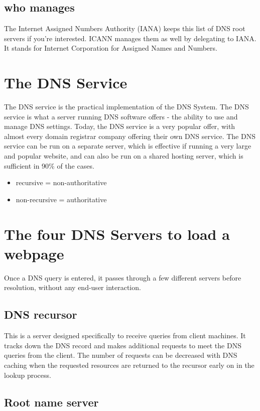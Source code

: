 \documentclass[a4paper,12pt]{book}
\begin{document}
\subsection{who manages}
The Internet Assigned Numbers Authority (IANA) keeps this list of DNS root servers if you're interested. ICANN manages them as well by delegating to IANA. It stands for Internet Corporation for Assigned Names and Numbers.

\section{The DNS Service}
The DNS service is the practical implementation of the DNS System. The DNS service is what a server running DNS software offers - the ability to use and manage DNS settings. Today, the DNS service is a very popular offer, with almost every domain registrar company offering their own DNS service. The DNS service can be run on a separate server, which is effective if running a very large and popular website, and can also be run on a shared hosting server, which is sufficient in 90\% of the cases.

\begin{itemize}
\item{recursive = non-authoritative}
\item{non-recursive = authoritative}
\end{itemize}

\section{The four DNS Servers to load a webpage}
Once a DNS query is entered, it passes through a few different servers before resolution, without any end-user interaction.

\subsection{DNS recursor}

This is a server designed specifically to receive queries from client machines. It tracks down the DNS record and makes additional requests to meet the DNS queries from the client. The number of requests can be decreased with DNS caching when the requested resources are returned to the recursor early on in the lookup process.

\subsection{Root name server}
\end{document}

